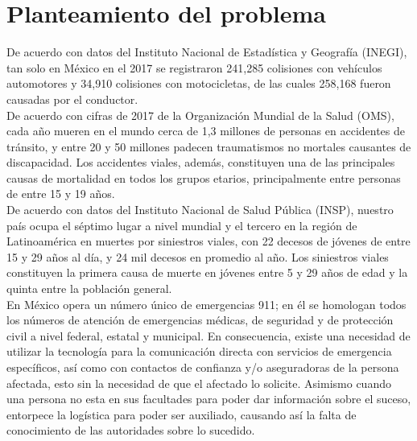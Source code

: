 
\section{Planteamiento del problema}
De acuerdo con datos del Instituto Nacional de Estadística y Geografía (INEGI), tan solo en México en el 2017 se registraron 241,285 colisiones con vehículos automotores y 34,910 colisiones con motocicletas, de las cuales 258,168 fueron causadas por el conductor.\\ 

De acuerdo con cifras de 2017 de la Organización Mundial de la Salud (OMS), cada año mueren en el mundo cerca de 1,3 millones de personas en accidentes de tránsito, y entre 20 y 50 millones padecen traumatismos no mortales causantes de discapacidad. Los accidentes viales, además, constituyen una de las principales causas de mortalidad en todos los grupos etarios, principalmente entre personas de entre 15 y 19 años.\\

De acuerdo con datos del Instituto Nacional de Salud Pública (INSP), nuestro país ocupa el séptimo lugar a nivel mundial y el tercero en la región de Latinoamérica en muertes por siniestros viales, con 22 decesos de jóvenes de entre 15 y 29 años al día, y 24 mil decesos en promedio al año. Los siniestros viales constituyen la primera causa de muerte en jóvenes entre 5 y 29 años de edad y la quinta entre la población general.\\

En México opera un número único de emergencias 911; en él se homologan todos los números de atención de emergencias médicas, de seguridad y de protección civil a nivel federal, estatal y municipal. En consecuencia, existe una necesidad de utilizar la tecnología para la comunicación directa con servicios de emergencia específicos, así como con contactos de confianza y/o aseguradoras de la persona afectada, esto sin la necesidad de que el afectado lo solicite. Asimismo cuando una persona no esta en sus facultades para poder dar información sobre el suceso, entorpece la logística para poder ser auxiliado, causando así la falta de conocimiento de las autoridades sobre lo sucedido. 



